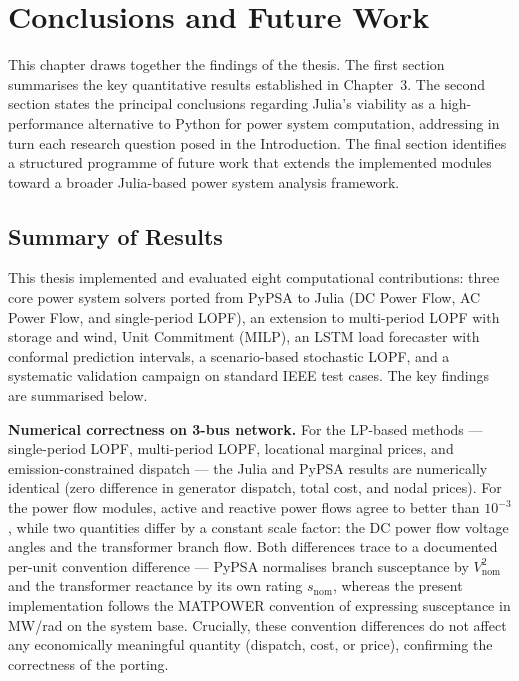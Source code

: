 \chapter{Conclusions and Future Work}
\label{ch:conclusions}

This chapter draws together the findings of the thesis. The first section summarises the key quantitative results established in Chapter~3. The second section states the principal conclusions regarding Julia's viability as a high-performance alternative to Python for power system computation, addressing in turn each research question posed in the Introduction. The final section identifies a structured programme of future work that extends the implemented modules toward a broader Julia-based power system analysis framework.

\section{Summary of Results}

This thesis implemented and evaluated eight computational contributions: three core power system solvers ported from PyPSA to Julia (DC Power Flow, AC Power Flow, and single-period LOPF), an extension to multi-period LOPF with storage and wind, Unit Commitment (MILP), an LSTM load forecaster with conformal prediction intervals, a scenario-based stochastic LOPF, and a systematic validation campaign on standard IEEE test cases. The key findings are summarised below.

\textbf{Numerical correctness on 3-bus network.}
For the LP-based methods --- single-period LOPF, multi-period LOPF, locational marginal prices, and emission-constrained dispatch --- the Julia and PyPSA results are numerically identical (zero difference in generator dispatch, total cost, and nodal prices). For the power flow modules, active and reactive power flows agree to better than $10^{-3}$, while two quantities differ by a constant scale factor: the DC power flow voltage angles and the transformer branch flow. Both differences trace to a documented per-unit convention difference --- PyPSA normalises branch susceptance by $V_\text{nom}^2$ and the transformer reactance by its own rating $s_\text{nom}$, whereas the present implementation follows the MATPOWER convention of expressing susceptance in MW/rad on the system base. Crucially, these convention differences do not affect any economically meaningful quantity (dispatch, cost, or price), confirming the correctness of the porting.


